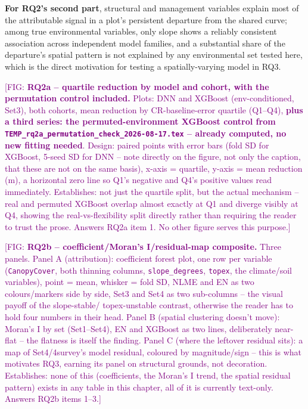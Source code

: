 \documentclass[11pt,a4paper]{report}
\newcommand{\fig}[1]{\textcolor{purple}{[FIG: #1]}}
\begin{document}
\textbf{For RQ2's second part}, structural and management variables explain most of
the attributable signal in a plot's persistent departure from the shared curve; among
true environmental variables, only slope shows a reliably consistent association
across independent model families, and a substantial share of the departure's spatial
pattern is not explained by any environmental set tested here, which is the direct
motivation for testing a spatially-varying model in RQ3.

\fig{\textbf{RQ2a -- quartile reduction by model and cohort, with the permutation
control included.} Plots: DNN and XGBoost (env-conditioned, Set3), both cohorts, mean
reduction by CR-baseline-error quartile (Q1--Q4), \textbf{plus a third series: the
permuted-environment XGBoost control from
\texttt{TEMP\_rq2a\_permutation\_check\_2026-08-17.tex} -- already computed, no new
fitting needed}. Design: paired points with error bars (fold SD for XGBoost, 5-seed SD
for DNN -- note directly on the figure, not only the caption, that these are not on the
same basis), x-axis = quartile, y-axis = mean reduction (m), a horizontal zero line so
Q1's negative and Q4's positive values read immediately. Establishes: not just the
quartile split, but the actual mechanism -- real and permuted XGBoost overlap almost
exactly at Q1 and diverge visibly at Q4, showing the real-vs-flexibility split directly
rather than requiring the reader to trust the prose. Answers RQ2a item 1. No other
figure serves this purpose.}

\fig{\textbf{RQ2b -- coefficient/Moran's I/residual-map composite.} Three panels.
Panel A (attribution): coefficient forest plot, one row per variable (\texttt{CanopyCover},
both thinning columns, \texttt{slope\_degrees}, \texttt{topex}, the climate/soil
variables), point = mean, whisker = fold SD, NLME and EN as two colours/markers side by
side, Set3 and Set4 as two sub-columns -- the visual payoff of the slope-stable/
topex-unstable contrast, otherwise the reader has to hold four numbers in their head.
Panel B (spatial clustering doesn't move): Moran's I by set (Set1--Set4), EN and
XGBoost as two lines, deliberately near-flat -- the flatness is itself the finding.
Panel C (where the leftover residual sits): a map of Set4/4survey's model residual,
coloured by magnitude/sign -- this is what motivates RQ3, earning its panel on
structural grounds, not decoration. Establishes: none of this (coefficients, the
Moran's I trend, the spatial residual pattern) exists in any table in this chapter, all
of it is currently text-only. Answers RQ2b items 1--3.}
\end{document}
